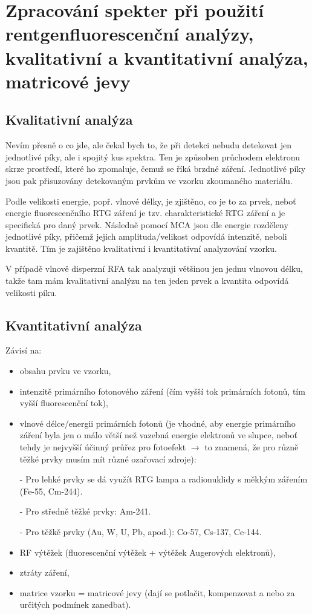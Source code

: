 \section[Aplikace rentgnofluorescenční analýzy]{Zpracování spekter při použití rentgenfluorescenční analýzy, kvalitativní a kvantitativní analýza, matricové jevy}

\subsection{Kvalitativní analýza}

Nevím přesně o co jde, ale čekal bych to, že při detekci nebudu detekovat jen jednotlivé píky, ale i spojitý kus spektra. Ten je způsoben průchodem elektronu skrze prostředí, které ho zpomaluje, čemuž se říká brzdné záření. Jednotlivé píky jsou pak přisuzovány detekovaným prvkům ve vzorku zkoumaného materiálu.

Podle velikosti energie, popř. vlnové délky, je zjištěno, co je to za prvek, neboť energie fluorescenčního RTG záření je tzv. charakteristické RTG záření a je specifická pro daný prvek. Následně pomocí MCA jsou dle energie rozděleny jednotlivé píky, přičemž jejich amplituda/velikost odpovídá intenzitě, neboli kvantitě. Tím je zajištěno kvalitativní i kvantitativní analyzování vzorku.

V případě vlnově disperzní RFA tak analyzuji většinou jen jednu vlnovou délku, takže tam mám kvalitativní analýzu na ten jeden prvek a kvantita odpovídá velikosti píku.

\subsection{Kvantitativní analýza}

Závisí na: 

\begin{itemize}
    \item obsahu prvku ve vzorku,
    \item intenzitě primárního fotonového záření (čím vyšší tok primárních fotonů, tím vyšší fluorescenční tok),
    \item vlnové délce/energii primárních fotonů (je vhodné, aby energie primárního záření byla jen o málo větší než vazebná energie elektronů ve slupce, neboť tehdy je nejvyšší účinný průřez pro fotoefekt $\rightarrow$ to znamená, že pro různě těžké prvky musím mít různé ozařovací zdroje):
    \item[-] Pro lehké prvky se dá využít RTG lampa a radionuklidy s měkkým zářením (Fe-55, Cm-244).
    \item[-] Pro středně těžké prvky: Am-241.
    \item[-] Pro těžkě prvky (Au, W, U, Pb, apod.): Co-57, Cs-137, Ce-144.
    \item RF výtěžek (fluorescenční výtěžek + výtěžek Augerových elektronů),
    \item ztráty záření,
    \item matrice vzorku = matricové jevy (dají se potlačit, kompenzovat a nebo za určitých podmínek zanedbat).
\end{itemize}

